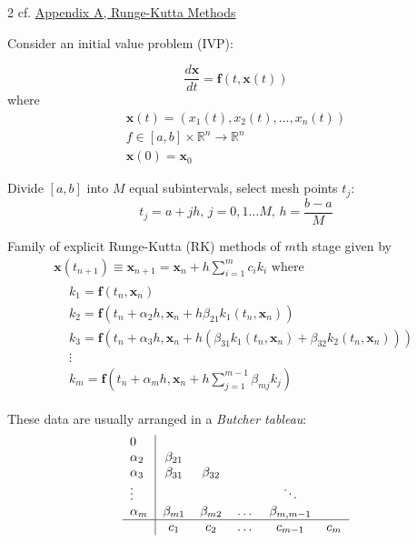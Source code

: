 \documentclass[10pt]{amsart}
\begin{document}
\begin{multicols*}{2}
cf. \href{https://www.uni-muenster.de/imperia/md/content/physik_tp/lectures/ss2017/numerische_Methoden_fuer_komplexe_Systeme_II/rkm-1.pdf}{Appendix A, Runge-Kutta Methods}

Consider an initial value problem (IVP):

\begin{equation}
	\frac{d\mathbf{x}}{dt} = \mathbf{f}(t, \mathbf{x}(t)) 
\end{equation}
where
\[
\begin{gathered}
	\mathbf{x}(t) = (x_1(t), x_2(t), \dots, x_n(t)) \\
	f\in [a,b] \times \mathbb{R}^n \to \mathbb{R}^n \\
	\mathbf{x}(0) = \mathbf{x}_0
\end{gathered}
\]

Divide $[a,b]$ into $M$ equal subintervals, select mesh points $t_j$:
\[
t_j = a+ jh, \, j = 0, 1\dots M, \, h = \frac{b-a}{M}
\]

Family of explicit Runge-Kutta (RK) methods of $m$th stage given by
\begin{equation}\label{Eq:ERKmethodsMthStage}
\begin{gathered}
	\mathbf{x}(t_{n+1}) \equiv \mathbf{x}_{n+1} = \mathbf{x}_n + h \sum_{i=1}^m c_i k_i \text{ where } \\
	\begin{aligned}
		& k_1 = \mathbf{f}(t_n, \mathbf{x}_n) \\
		& k_2 = \mathbf{f}(t_n + \alpha_2 h, \mathbf{x}_n + h\beta_{21} k_1(t_n, \mathbf{x}_n)) \\
		& k_3 = \mathbf{f}(t_n + \alpha_3 h, \mathbf{x}_n + h( \beta_{31} k_1(t_n, \mathbf{x}_n) + \beta_{32} k_2(t_n, \mathbf{x}_n))) \\
		& \vdots \\
		& k_m = \mathbf{f}(t_n + \alpha_m h, \mathbf{x}_n + h \sum_{j=1}^{m-1} \beta_{mj}k_j)
	\end{aligned}
\end{gathered}
\end{equation}

These data are usually arranged in a \emph{Butcher tableau}:
\[
\begin{tabular}{ l|c c c c c }
	0 & & & & & \\
	$\alpha_2$ & $\beta_{21}$ &  & & & \\ 
	$\alpha_3$ & $\beta_{31}$ & $\beta_{32}$ & & & \\ 
	$\vdots$ &  & & & $\ddots$ & \\ 
	$\alpha_m$ & $\beta_{m1}$ & $\beta_{m2}$ & \dots & $\beta_{m, m-1}$ & \\
	\hline 
	& $c_1$ & $c_2$ & \dots & $c_{m-1}$ & $c_m$ \\
\end{tabular}
\]


\end{multicols*}
\end{document}
